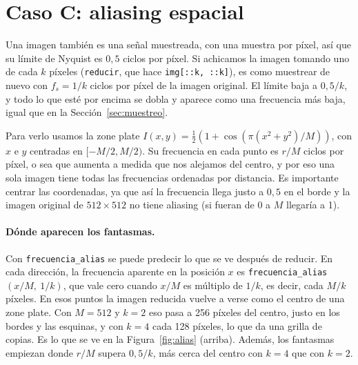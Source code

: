 %

\section{Caso C: aliasing espacial}
\label{sec:aliasing}

Una imagen también es una señal muestreada, con una muestra por píxel, así que su límite de
Nyquist es $0{,}5$ ciclos por píxel. Si achicamos la imagen tomando uno de cada $k$ píxeles
(\texttt{reducir}, que hace \texttt{img[::k, ::k]}), es como muestrear de nuevo con
$f_s = 1/k$ ciclos por píxel de la imagen original. El límite baja a $0{,}5/k$, y todo lo que esté
por encima se dobla y aparece como una frecuencia más baja, igual que en la
Sección~\ref{sec:muestreo}.

Para verlo usamos la zone plate $I(x,y) = \tfrac12\left(1+\cos\left(\pi(x^2+y^2)/M\right)\right)$,
con $x$ e $y$ centradas en $[-M/2, M/2)$. Su frecuencia en cada punto es $r/M$ ciclos por píxel,
o sea que aumenta a medida que nos alejamos del centro, y por eso una sola imagen tiene todas las
frecuencias ordenadas por distancia. Es importante centrar las coordenadas, ya que así la
frecuencia llega justo a $0{,}5$ en el borde y la imagen original de $512\times512$ no tiene
aliasing (si fueran de $0$ a $M$ llegaría a 1).

\paragraph{Dónde aparecen los fantasmas.} Con \texttt{frecuencia\_alias} se puede predecir lo que
se ve después de reducir. En cada dirección, la frecuencia aparente en la posición $x$ es
\texttt{frecuencia\_alias}$(x/M,\ 1/k)$, que vale cero cuando $x/M$ es múltiplo de $1/k$, es decir,
cada $M/k$ píxeles. En esos puntos la imagen reducida vuelve a verse como el centro de una zone
plate. Con $M=512$ y $k=2$ eso pasa a 256 píxeles del centro, justo en los bordes y las esquinas, y
con $k=4$ cada 128 píxeles, lo que da una grilla de copias. Es lo que se ve en la
Figura~\ref{fig:alias} (arriba). Además, los fantasmas empiezan donde $r/M$ supera $0{,}5/k$, más
cerca del centro con $k=4$ que con $k=2$.

